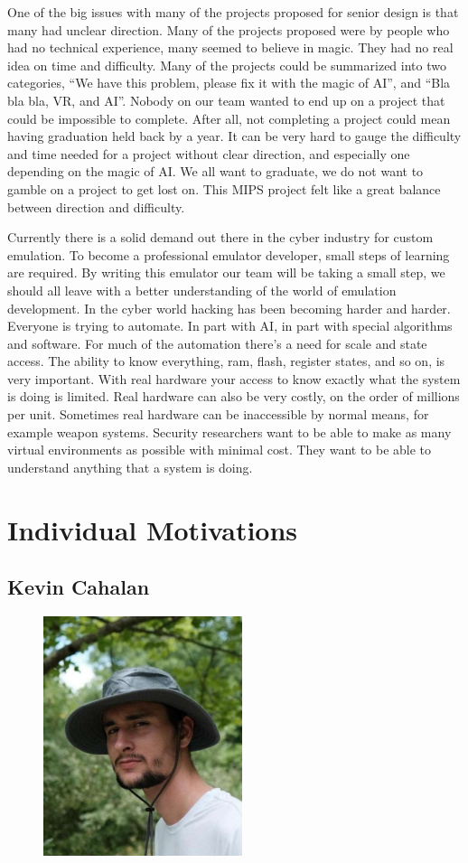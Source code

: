 \documentclass[
    parskip=half,
    fontsize=12pt,
    titlepage=firstiscover,
    toc=bibliography,
    numbers=endperiod
]{scrartcl}
\let\oldsection\section
\renewcommand{\section}{\newpage\oldsection}
\begin{document}
One of the big issues with many of the projects proposed for senior design is that many had unclear direction. Many of the projects proposed were by people who had no technical experience, many seemed to believe in magic. They had no real idea on time and difficulty. Many of the projects could be summarized into two categories, “We have this problem, please fix it with the magic of AI”, and “Bla bla bla, VR, and AI”. Nobody on our team wanted to end up on a project that could be impossible to complete. After all, not completing a project could mean having graduation held back by a year. It can be very hard to gauge the difficulty and time needed for a project without clear direction, and especially one depending on the magic of AI. We all want to graduate, we do not want to gamble on a project to get lost on. This MIPS project felt like a great balance between direction and difficulty.

Currently there is a solid demand out there in the cyber industry for custom emulation. To become a professional emulator developer, small steps of learning are required. By writing this emulator our team will be taking a small step, we should all leave with a better understanding of the world of emulation development. In the cyber world hacking has been becoming harder and harder. Everyone is trying to automate. In part with AI, in part with special algorithms and software. For much of the automation there's a need for scale and state access. The ability to know everything, ram, flash, register states, and so on, is very important. With real hardware your access to know exactly what the system is doing is limited. Real hardware can also be very costly, on the order of millions per unit. Sometimes real hardware can be inaccessible by normal means, for example weapon systems. Security researchers want to be able to make as many virtual environments as possible with minimal cost. They want to be able to understand anything that a system is doing.

\section{Individual Motivations}
\subsection{Kevin Cahalan}
\begin{figure}[H]
    \includegraphics[height=7cm]{profile-kevin}
\end{figure}
\end{document}
